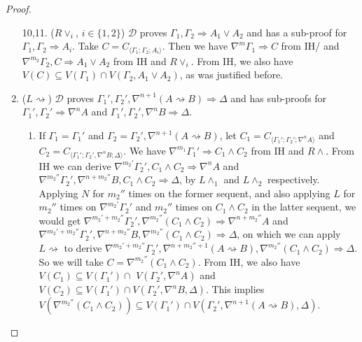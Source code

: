 \documentclass[12pt,a4paper]{article}
\theoremstyle{plain}
\theoremstyle{definition}
\begin{document}
\begin{proof}
\begin{enumerate}
		\item[10,11.] ($R\lor_i$, {\small$i \in \{1,2\}$}) $\mathcal{D}$ proves $\Gamma_1 , \Gamma_2 \Rightarrow A_1 \lor A_2$ and has a sub-proof for $\Gamma_1 , \Gamma_2 \Rightarrow A_i$. Take $C = C_{\langle\Gamma_1;\Gamma_2;A_i\rangle}$. Then we have $\nabla^m \Gamma_1 \Rightarrow C$ from IH/ and $\nabla^{m_2} \Gamma_2 , C \Rightarrow A_1 \lor A_2$ from IH and $R\lor_i$.
		From IH, we also have $V(C) \subseteq V(\Gamma_1) \cap V(\Gamma_2 , A_1 \lor A_2)$, as was justified before.
		\setcounter{enumi}{11}

		\item ($L\rightsquigarrow$) $\mathcal{D}$ proves $\Gamma_1' , \Gamma_2' , \nabla^{n+1} (A \rightsquigarrow B) \Rightarrow \Delta$ and has sub-proofs for $\Gamma_1' , \Gamma_2' \Rightarrow \nabla^n A$ and $\Gamma_1' , \Gamma_2' , \nabla^n B \Rightarrow \Delta$.
		\begin{enumerate}
			\item If $\Gamma_1 = \Gamma_1'$ and $\Gamma_2 = \Gamma_2' , \nabla^{n+1} (A \rightsquigarrow B)$, let $C_1 = C_{\langle\Gamma_1';\Gamma_2';\nabla^n A\rangle}$ and $C_2 = C_{\langle\Gamma_1';\Gamma_2',\nabla^n B;\Delta\rangle}$.
			We have $\nabla^{m_1} \Gamma_1' \Rightarrow C_1 \land C_2$ from IH and $R\land$.
			From IH we can derive $\nabla^{m_2'} \Gamma_2' , C_1 \land C_2 \Rightarrow \nabla^n A$ and $\nabla^{m_2''} \Gamma_2' , \nabla^{n+m_2''} B , C_1 \land C_2 \Rightarrow \Delta$, by $L\land_1$ and $L\land_2$ respectively. Applying $N$ for $m_2''$ times on the former sequent, and also applying $L$ for $m_2''$ times on $\nabla^{m_2'} \Gamma_2'$ and $m_2''$ times on $C_1 \wedge C_2$ in the latter sequent, we would get $\nabla^{m_2'+m_2''} \Gamma_2' , \nabla^{m_2''} (C_1 \land C_2) \Rightarrow \nabla^{n+m_2''} A$ and $\nabla^{m_2'+m_2''} \Gamma_2' , \nabla^{n+m_2''} B , \nabla^{m_2''} (C_1 \land C_2) \Rightarrow \Delta$, on which we can apply $L\rightsquigarrow$ to derive $\nabla^{m_2'+m_2''} \Gamma_2' , \nabla^{n+m_2''+1} (A \rightsquigarrow B) , \nabla^{m_2''} (C_1 \land C_2) \Rightarrow \Delta$. So we will take $C = \nabla^{m_2''}(C_1 \wedge C_2)$.
			From IH, we also have $V(C_1) \subseteq V(\Gamma_1') \cap$ $V(\Gamma_2' , \nabla^n A)$ and $V(C_2) \subseteq V(\Gamma_1') \cap V(\Gamma_2' , \nabla^n B , \Delta)$. This implies $V(\nabla^{m_2''}(C_1 \land C_2)‎) \subseteq V(\Gamma_1') \cap V(\Gamma_2' , \nabla^{n+1} (A \rightsquigarrow B) , \Delta)$.


\end{enumerate}
\end{enumerate}
\end{proof}
\end{document}
